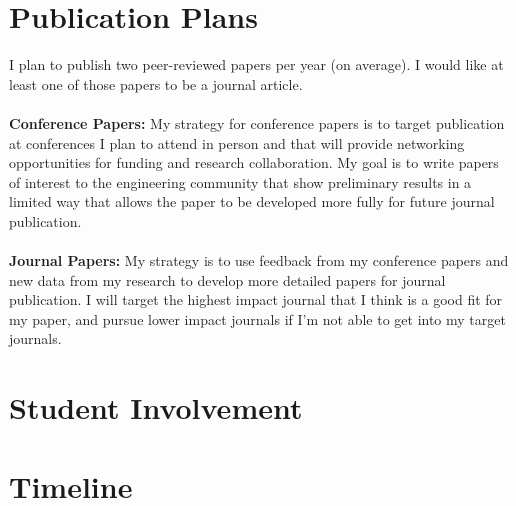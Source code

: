 \documentclass[10pt,letterpaper]{article}
\begin{document}
\section{Publication Plans}
I plan to publish two peer-reviewed papers per year (on average).
I would like at least one of those papers to be a journal article.
\\
\\
\noindent \textbf{Conference Papers:} My strategy for conference papers is to target publication at conferences I plan to attend in person and that will provide networking opportunities for funding and research collaboration.
My goal is to write papers of interest to the engineering community that show preliminary results in a limited way that allows the paper to be developed more fully for future journal publication.
\\
\\
\noindent \textbf{Journal Papers:} My strategy is to use feedback from my conference papers and new data from my research to develop more detailed papers for journal publication. 
I will target the highest impact journal that I think is a good fit for my paper, and pursue lower impact journals if I'm not able to get into my target journals.
\section{Student Involvement}
\section{Timeline}
\end{document}
